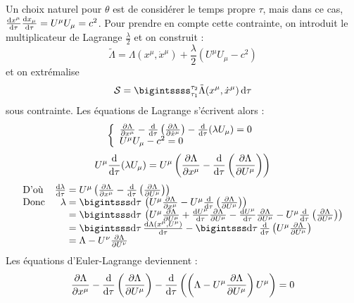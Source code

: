 {\txt Un choix naturel pour $\theta$ est de considérer le temps propre $\tau$, mais dans ce cas, $\frac{\mathrm{d} x^\mu}{\mathrm{d}\tau}\frac{\mathrm{d} x_\mu}{\mathrm{d}\tau}=U^\mu U_\mu=c^2$. Pour prendre en compte cette contrainte, on introduit le multiplicateur de Lagrange $\frac{\lambda}{2}$ et on construit :}
$$
	\tilde{\Lambda}=\Lambda(x^\mu,\dot{x}^\mu)+\frac{\lambda}{2}(U^\mu U_\mu-c^2)
$$
et on extrémalise 
$$
	\mathcal{S}=\bigintssss_{\tau_1}^{\tau_2} \tilde{\Lambda}(x^\mu,\dot{x}^\mu)\,\dif\tau
$$
sous contrainte. Les équations de Lagrange s'écrivent alors :
$$
	\left\{ \begin{array}{l}
		\frac{\partial\Lambda}{\partial x^\mu}-\frac{\mathrm{d}}{\mathrm{d}\tau}\left(\frac{\partial \Lambda}{\partial\dot{x}^\mu}\right)-\frac{\mathrm{d}}{\mathrm{d}\tau}(\lambda U_\mu)=0	\\
		U^\mu U_\mu-c^2=0
	\end{array} \right.
$$
$$
	U^\mu \frac{\mathrm{d}}{\mathrm{d}\tau}(\lambda U_\mu)=U^\mu\left(\frac{\partial\Lambda}{\partial x^\mu}-\frac{\mathrm{d}}{\mathrm{d}\tau}\left(\frac{\partial \Lambda}{\partial U^\mu}\right)\right)
$$
$$
	\begin{array}{lr@{\;}l}
		\text{D'où}&\frac{\dif \lambda}{\dif\tau}&=U^\mu\left(\frac{\partial\Lambda}{\partial x^\mu}-\frac{\dif}{\dif\tau}\left(\frac{\partial \Lambda}{\partial U^\mu}\right)\right)\\
		\text{Donc}&\lambda &=\bigintsss\dif\tau\,\left( U^\mu \frac{\partial\Lambda}{\partial x^\mu}-U^\mu \frac{\dif}{\dif\tau}\left(\frac{\partial \Lambda}{\partial U^\mu}\right)\right)\\
		&&=\bigintsss\dif\tau\,\left(U^\mu \frac{\partial \Lambda}{\partial U^\mu}+ \frac{\dif U^\mu}{\dif\tau}\frac{\partial\Lambda}{\partial U^\mu}-\frac{\dif U^\mu}{\dif\tau}\frac{\partial\Lambda}{\partial U^\mu}-U^\mu \frac{\dif}{\dif\tau}\left(\frac{\partial \Lambda}{\partial U^\mu}\right) \right)\\
		&&=\bigintsss\dif\tau\,\frac{\dif\Lambda(x^\mu ,U^\mu)}{\dif\tau} - \bigintsss\dif\tau\,\frac{\dif}{\dif\tau}\left(U^\mu\frac{\partial \Lambda}{\partial U^\mu} \right) \\
		&&=\Lambda-U^\nu\frac{\partial \Lambda}{\partial U^\nu}
	\end{array}
$$
Les équations d'Euler-Lagrange deviennent :
$$
	\frac{\partial\Lambda}{\partial x^\mu}-\frac{\mathrm{d}}{\mathrm{d}\tau}\left(\frac{\partial \Lambda}{\partial U^\mu}\right)-\frac{\mathrm{d}}{\mathrm{d}\tau}\left(\left(\Lambda-U^\mu\frac{\partial\Lambda}{\partial U^\mu}\right) U^\mu\right)=0
$$

